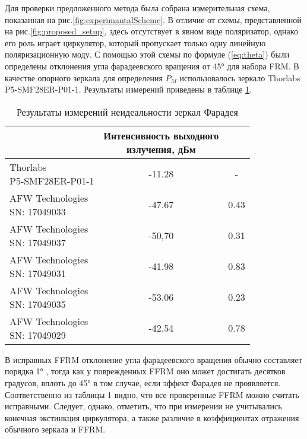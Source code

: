 \documentclass{article}
\begin{document}
Для проверки предложенного метода была собрана измерительная схема, показанная на рис.\ref{fig:experimantalScheme}.
В отличие от схемы, представленной на рис.\ref{fig:proposed_setup}, здесь отсутствует в явном виде поляризатор, однако его роль играет циркулятор, который пропускает только одну линейную поляризационную моду.
С помощью этой схемы по формуле (\ref*{eq:theta}) были определены отклонения угла фарадеевского вращения от 45° для набора FRM.
В качестве опорного зеркала для определения $P_M$ использовалось зеркало Thorlabs P5-SMF28ER-P01-1.
Результаты измерений приведены в таблице \ref{tabular:results}.
\begin{table}[h]
	\caption{Результаты измерений неидеальности зеркал Фарадея}
	\label{tabular:results}
		\begin{tabularx}{\textwidth}{|X|c|c|}
			\hline
			\thead{Зеркало} & \thead{Интенсивность выходного \\ излучения, дБм} & \thead{Неидеальность FRM, град} \\
			\hline
			\makecell{Thorlabs \\ P5-SMF28ER-P01-1} & -11.28 & - \\	
			\hline
			\makecell{AFW Technologies \\ SN: 17049033} & -47.67 & 0.43 \\
			\hline
			\makecell{AFW Technologies \\ SN: 17049037}	& -50,70 & 0.31 \\
			\hline
			\makecell{AFW Technologies \\ SN: 17049031}	& -41.98 & 0.83 \\
			\hline
			\makecell{AFW Technologies \\ SN: 17049035}	& -53.06 & 0.23 \\
			\hline
			\makecell{AFW Technologies \\ SN: 17049029} & -42.54 & 0.78 \\
			\hline
		\end{tabularx}
\end{table}

В исправных FFRM отклонение угла фарадеевского вращения обычно составляет порядка 1° \autocite{paschottaFaradayMirrors2022}, тогда как у поврежденных FFRM оно может достигать десятков градусов, вплоть до 45° в том случае, если эффект Фарадея не проявляется.
Соответственно из таблицы 1 видно, что все проверенные FFRM можно считать исправными.
Следует, однако, отметить, что при измерении не учитывались конечная экстинкция циркулятора, а также различие в коэффициентах отражения обычного зеркала и FFRM.
\end{document}
